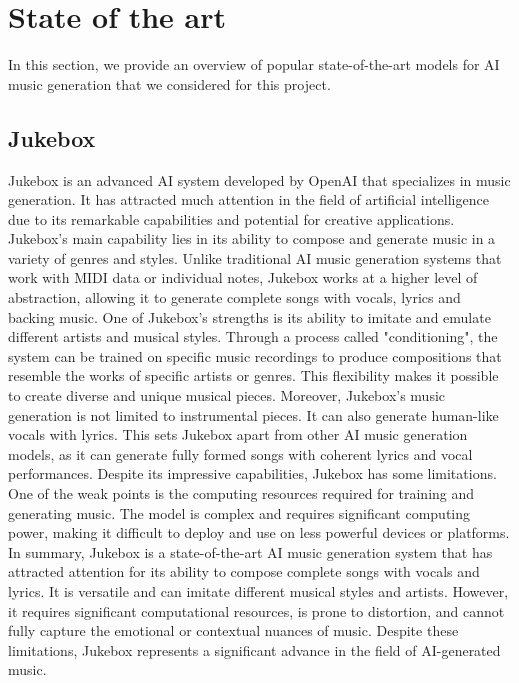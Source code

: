 \documentclass{article}
\begin{document}
\section{State of the art}

In this section, we provide an overview of popular state-of-the-art models for AI music generation that we considered for this project.

\subsection{Jukebox}
Jukebox is an advanced AI system developed by OpenAI that specializes in music generation. It has attracted much attention in the field of artificial intelligence due to its remarkable capabilities and potential for creative applications.
Jukebox's main capability lies in its ability to compose and generate music in a variety of genres and styles. Unlike traditional AI music generation systems that work with MIDI data or individual notes, Jukebox works at a higher level of abstraction, allowing it to generate complete songs with vocals, lyrics and backing music.
One of Jukebox's strengths is its ability to imitate and emulate different artists and musical styles. Through a process called "conditioning", the system can be trained on specific music recordings to produce compositions that resemble the works of specific artists or genres. This flexibility makes it possible to create diverse and unique musical pieces.
Moreover, Jukebox's music generation is not limited to instrumental pieces. It can also generate human-like vocals with lyrics. This sets Jukebox apart from other AI music generation models, as it can generate fully formed songs with coherent lyrics and vocal performances.
Despite its impressive capabilities, Jukebox has some limitations. One of the weak points is the computing resources required for training and generating music. The model is complex and requires significant computing power, making it difficult to deploy and use on less powerful devices or platforms.
In summary, Jukebox is a state-of-the-art AI music generation system that has attracted attention for its ability to compose complete songs with vocals and lyrics. It is versatile and can imitate different musical styles and artists. However, it requires significant computational resources, is prone to distortion, and cannot fully capture the emotional or contextual nuances of music. Despite these limitations, Jukebox represents a significant advance in the field of AI-generated music.
\end{document}
